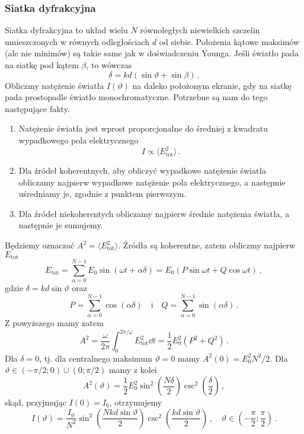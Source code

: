 \documentclass[../main.tex]{subfiles}
\begin{document}
\subsubsection{Siatka dyfrakcyjna}
Siatka dyfrakcyjna to układ wielu \(N\) równoległych niewielkich szczelin umieszczonych w równych
odległościach \(d\) od siebie. Położenia kątowe maksimów (ale nie minimów) są takie same jak w
doświadczeniu Younga. Jeśli światło pada na siatkę pod kątem \(\beta\), to wówczas
\begin{equation*}
    \delta =kd(\sin\vartheta+\sin\beta)\,.
\end{equation*}
Obliczmy natężenie światła \(I(\vartheta)\) na daleko położonym ekranie, gdy na siatkę pada
prostopadle światło monochromatyczne. Potrzebne są nam do tego następujące fakty.
\begin{enumerate}
    \item Natężenie światła jest wprost proporcjonalne do średniej z kwadratu wypadkowego pola
    elektrycznego
    \begin{equation*}
        I\propto \langle E_\text{tot}^2\rangle\,.
    \end{equation*}
    
    \item Dla źródeł koherentnych, aby obliczyć wypadkowe natężenie światła obliczamy najpierw
    wypadkowe natężenie pola elektrycznego, a następnie uśredniamy je, zgodnie z punktem pierwszym.
    
    \item Dla źródeł niekoherentych obliczamy najpierw średnie natężenia światła, a następnie je
    sumujemy.
\end{enumerate}
Będziemy oznaczać \(A^2=\langle E_\text{tot}^2\rangle\). Źródła są koherentne, zatem obliczmy
najpierw \(E_\text{tot}\)
\begin{equation*}
    E_\text{tot}=\sum_{\alpha=0}^{N-1}E_0\sin(\omega t+\alpha\delta)=E_0(P\sin\omega t +Q\cos\omega t)\,,
\end{equation*}
gdzie \(\delta =kd\sin\vartheta\) oraz
\begin{equation*}
    P=\sum_{\alpha=0}^{N-1}\cos(\alpha\delta)\quad\text{i}\quad Q=\sum_{\alpha=0}^{N-1}\sin(\alpha\delta)\,.
\end{equation*}
Z powyższego mamy zatem
\begin{equation*}
    A^2=\frac{\omega }{2\pi}\int_0^{2\pi/\omega}E_\text{tot}^2\dd{t}=\frac{1}{2}E_0^2(P^2+Q^2)\,.
\end{equation*}
Dla \(\delta=0\), tj. dla centralnego maksimum \(\vartheta=0\) mamy \(A^2(0)=E_0^2N^2/2\). Dla
\(\vartheta\in (-\pi/2;0)\cup(0;\pi/2)\) mamy z kolei
\begin{equation*}
    A^2(\vartheta)=\frac{1}{2}E_0^2\sin^2\left(\frac{N\delta}{2}\right)\csc^2\left(\frac{\delta}{2}\right)\,,
\end{equation*}
skąd, przyjmując \(I(0)=I_0\), otrzymujemy
\begin{equation*}
    I(\vartheta)=\frac{I_0}{N^2}\sin^2\left(\frac{Nkd\sin\vartheta}{2}\right)\csc^2\left(\frac{kd\sin\vartheta}{2}\right)\,,\quad \vartheta\in\left(-\frac{\pi}{2};\frac{\pi}{2}\right)\,.
\end{equation*}
\end{document}
